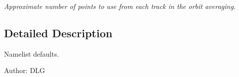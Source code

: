 \begin{CompactItemize}
\begin{CompactList}\small\item\em Approximate number of points to use from each track in the orbit averaging. \item\end{CompactList}\end{CompactItemize}


\subsection{Detailed Description}
Namelist defaults. 

\begin{Desc}
\item[Author:]DLG \end{Desc}



